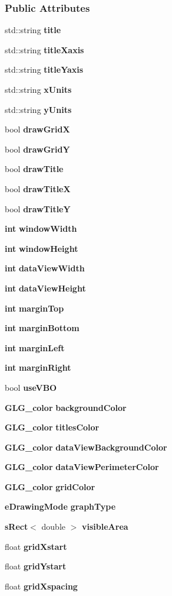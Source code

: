 \subsubsection*{Public Attributes}
\begin{DoxyCompactItemize}
\item 
std\+::string {\bf title}
\item 
std\+::string {\bf title\+Xaxis}
\item 
std\+::string {\bf title\+Yaxis}
\item 
std\+::string {\bf x\+Units}
\item 
std\+::string {\bf y\+Units}
\item 
bool {\bf draw\+GridX}
\item 
bool {\bf draw\+GridY}
\item 
bool {\bf draw\+Title}
\item 
bool {\bf draw\+TitleX}
\item 
bool {\bf draw\+TitleY}
\item 
{\bf int} {\bf window\+Width}
\item 
{\bf int} {\bf window\+Height}
\item 
{\bf int} {\bf data\+View\+Width}
\item 
{\bf int} {\bf data\+View\+Height}
\item 
{\bf int} {\bf margin\+Top}
\item 
{\bf int} {\bf margin\+Bottom}
\item 
{\bf int} {\bf margin\+Left}
\item 
{\bf int} {\bf margin\+Right}
\item 
bool {\bf use\+V\+BO}
\item 
{\bf G\+L\+G\+\_\+color} {\bf background\+Color}
\item 
{\bf G\+L\+G\+\_\+color} {\bf titles\+Color}
\item 
{\bf G\+L\+G\+\_\+color} {\bf data\+View\+Background\+Color}
\item 
{\bf G\+L\+G\+\_\+color} {\bf data\+View\+Perimeter\+Color}
\item 
{\bf G\+L\+G\+\_\+color} {\bf grid\+Color}
\item 
{\bf e\+Drawing\+Mode} {\bf graph\+Type}
\item 
{\bf s\+Rect}$<$ double $>$ {\bf visible\+Area}
\item 
float {\bf grid\+Xstart}
\item 
float {\bf grid\+Ystart}
\item 
float {\bf grid\+Xspacing}
\item 

\end{DoxyCompactItemize}

